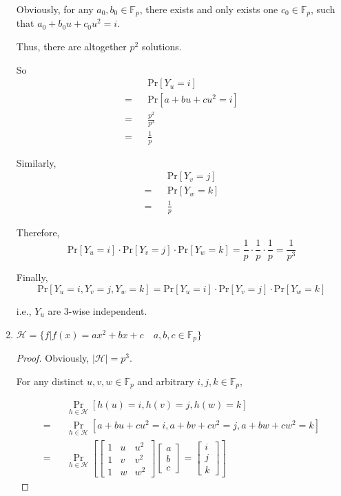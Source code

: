 \documentclass[12pt,a4]{article}
\newcounter{exercise}
\begin{document}
\begin{exercise}
\begin{enumerate}
			Obviously, for any $a_0, b_0 \in \mathbb{F}_{p}$, there exists and only exists one $c_0 \in \mathbb{F}_{p}$, such that $a_0 + b_0 u + c_0 u^2 = i$.
			
			Thus, there are altogether $p^2$ solutions.
			
			So
			\begin{eqnarray*}
				&&\text{Pr}[Y_u = i] \\
				= &&\text{Pr}[a + bu + cu^2 = i] \\
				= &&\frac{p^2}{p^3} \\
				= &&\frac{1}{p}
			\end{eqnarray*}
			
			Similarly,
			\begin{eqnarray*}
				&&\text{Pr}[Y_v = j] \\
				= &&\text{Pr}[Y_w = k] \\
				= &&\frac{1}{p}
			\end{eqnarray*}
			
			Therefore,
			\[
				\text{Pr}[Y_u = i] \cdot \text{Pr}[Y_v = j] \cdot \text{Pr}[Y_w = k] = \frac{1}{p} \cdot \frac{1}{p} \cdot \frac{1}{p} = \frac{1}{p^3}
			\]
			
			Finally,
			\[
				\text{Pr}[Y_u = i, Y_v = j, Y_w = k] = \text{Pr}[Y_u = i] \cdot \text{Pr}[Y_v = j] \cdot \text{Pr}[Y_w = k]
			\]
			
			i.e., $Y_u$ are $3$-wise independent.
		\item
		
			$\mathcal{H} = \{ f | f(x) = a x^2 + b x + c \quad a,b,c \in \mathbb{F}_{p} \}$
			
			\begin{proof}
				Obviously, $|\mathcal{H}| = p^3$.
				
				For any distinct $u, v, w \in \mathbb{F}_{p}$ and arbitrary $i, j, k \in \mathbb{F}_{p}$,
				
				\begin{eqnarray*}
					&&\mathop{\text{Pr}} \limits_{h \in \mathcal{H}} [h(u) = i, h(v) = j, h(w) = k] \\
					= &&\mathop{\text{Pr}} \limits_{h \in \mathcal{H}} [a + bu + cu^2 = i, a + bv + cv^2 = j, a + bw + cw^2 = k] \\
					= &&\mathop{\text{Pr}} \limits_{h \in \mathcal{H}}[
					\left[
					\begin{matrix}
						1 & u & u^2 \\
						1 & v & v^2 \\
						1 & w & w^2
					\end{matrix}
					\right]
					\left[
					\begin{matrix}
						a \\
						b \\
						c
					\end{matrix}
					\right]
					=
					\left[
					\begin{matrix}
						i \\
						j \\
						k
					\end{matrix}
					\right]
					]
				\end{eqnarray*}
				

\end{proof}
\end{enumerate}
\end{exercise}
\end{document}
